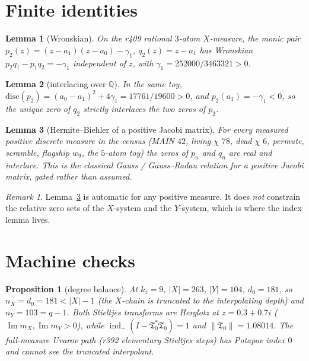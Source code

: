 \documentclass[11pt]{article}
\newtheorem{lemma}{Lemma}
\newtheorem{prop}{Proposition}
\theoremstyle{remark}
\newtheorem{remark}{Remark}
\newcommand{\Tfrak}{\mathfrak{T}}
\newcommand{\indm}{\operatorname{ind}_{-}}
\begin{document}
\section{Finite identities}\label{sec:satz}

\begin{lemma}[Wronskian]\label{lem:wron}
On the r409 rational $3$-atom $X$-measure, the monic pair
$p_2(z)=(z-a_1)(z-a_0)-\gamma_1$, $q_2(z)=z-a_1$ has
Wronskian $p_2 q_1 - p_1 q_2 = -\gamma_1$ independent of $z$,
with $\gamma_1=252000/3463321>0$.
\end{lemma}

\begin{lemma}[interlacing over $\mathbb{Q}$]\label{lem:inter}
In the same toy, $\mathrm{disc}(p_2)=(a_0-a_1)^2+4\gamma_1
=17761/19600>0$, and $p_2(a_1)=-\gamma_1<0$, so the unique
zero of $q_2$ strictly interlaces the two zeros of $p_2$.
\end{lemma}

\begin{lemma}[Hermite--Biehler of a positive Jacobi matrix]\label{lem:hb}
For every measured positive discrete measure in the census
(MAIN $42$, living $\chi$ $78$, dead $\chi$ $6$, permute,
scramble, flagship $w_9$, the $5$-atom toy) the zeros of
$p_n$ and $q_n$ are real and interlace.
This is the classical Gauss / Gauss--Radau relation for a
positive Jacobi matrix, gated rather than assumed.
\end{lemma}

\begin{remark}
Lemma~\ref{lem:hb} is automatic for any positive measure.
It does \emph{not} constrain the relative zero sets of the
$X$-system and the $Y$-system, which is where the index
lemma lives.
\end{remark}

\section{Machine checks}\label{sec:prop}

\begin{prop}[degree balance]\label{prop:balance}
At $k_z=9$, $|X|=263$, $|Y|=104$, $d_0=181$, so
$n_X=d_0=181<|X|-1$ (the $X$-chain is truncated to the
interpolating depth) and $n_Y=103=q-1$.
Both Stieltjes transforms are Herglotz at $z=0.3+0.7i$
($\operatorname{Im}m_X,\operatorname{Im}m_Y>0$), while
$\indm(I-\Tfrak_0^*\Tfrak_0)=1$ and $\|\Tfrak_0\|=1.08014$.
The full-measure Uvarov path (r392 elementary Stieltjes
steps) has Potapov index $0$ and cannot see the truncated
interpolant.
\end{prop}
\end{document}
